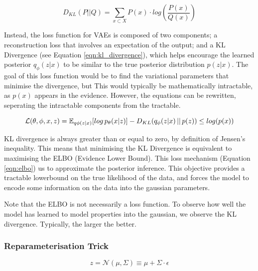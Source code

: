 \documentclass[12pt,twoside]{report}
\begin{document}
\begin{equation}
	\label{eqn:kl_divergence}
D_{KL}(P ||Q) = \sum_{x \subset X} P(x) \cdot log (\frac{P(x)}{Q(x)})
\end{equation}

Instead, the loss function for VAEs is composed of two components; a reconstruction loss that involves an expectation of the output; and a KL Divergence (see Equation \ref{eqn:kl_divergence}), which helps encourage the learned posterior $q_\phi(z|x)$ to be similar to the true posterior distribution $p(z|x)$. The goal of this loss function would be to find the variational parameters that minimise the divergence, but This would typically be mathematically intractable, as $p(x)$ appears in the evidence. However, the equations can be rewritten, seperating the intractable components from the tractable.

\begin{equation}
	\label{eqn:elbo}
	\mathcal{L}(\theta, \phi, x, z) = \mathbb{E}_{q \phi (z|x)}[log \thinspace p_{\theta}(x|z)] - D_{KL}(q_{\phi}(z|x)\thinspace||\thinspace p(z)) \leq log (p(x))
\end{equation}

KL divergence is always greater than or equal to zero, by definition of Jensen's inequality. This means that minimising the KL Divergence is equivalent to maximising the ELBO (Evidence Lower Bound). This loss mechanism (Equation \ref{eqn:elbo})  us to approximate the posterior inference. This objective provides a tractable lowerbound on the true likelihood of the data, and forces the model to encode some information on the data into the gaussian parameters.

Note that the ELBO is not necessarily a loss function. To observe how well the model has learned to model properties into the gaussian, we observe the KL divergence. Typically, the larger the better.


\subsubsection*{Reparameterisation Trick}
\label{reparam_trick}

\begin{equation}
	\label{eqn:reparam}
	z = \mathcal{N}(\mu, \Sigma) \equiv \mu + \Sigma \cdot \epsilon
\end{equation}
\end{document}
